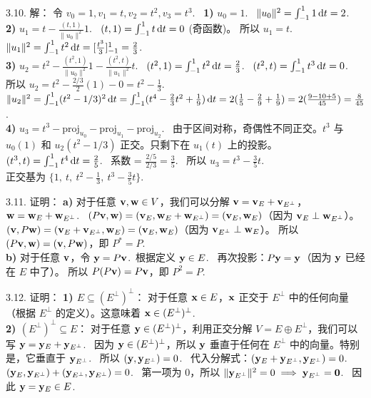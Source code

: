 \begin{exer}
3.10. 解：
令 $v_0 = 1, v_1 = t, v_2 = t^2, v_3 = t^3$.~
\textbf{1)} $u_0 = 1$.~
$\|u_0\|^2 = \int_{-1}^1 1 \mathop{}\!\mathrm{d} t = 2$.~
\\
\textbf{2)} $u_1 = t - \frac{(t, 1)}{\|u_0\|^2} 1$.~
$(t, 1) = \int_{-1}^1 t \mathop{}\!\mathrm{d} t = 0$ (奇函数)。
所以 $u_1 = t$.~
$\|u_1\|^2 = \int_{-1}^1 t^2 \mathop{}\!\mathrm{d} t = [\frac{t^3}{3}]_{-1}^1 = \frac{2}{3}$.~
\\
\textbf{3)} $u_2 = t^2 - \frac{(t^2, 1)}{\|u_0\|^2} 1 - \frac{(t^2, t)}{\|u_1\|^2} t$.~
$(t^2, 1) = \int_{-1}^1 t^2 \mathop{}\!\mathrm{d} t = \frac{2}{3}$.~
$(t^2, t) = \int_{-1}^1 t^3 \mathop{}\!\mathrm{d} t = 0$.~
所以 $u_2 = t^2 - \frac{2/3}{2} (1) - 0 = t^2 - \frac{1}{3}$.~
$\|u_2\|^2 = \int_{-1}^1 (t^2 - 1/3)^2 \mathop{}\!\mathrm{d} t = \int_{-1}^1 (t^4 - \frac{2}{3}t^2 + \frac{1}{9}) \mathop{}\!\mathrm{d} t = 2(\frac{1}{5} - \frac{2}{9} + \frac{1}{9}) = 2(\frac{9 - 10 + 5}{45}) = \frac{8}{45}$.~
\\
\textbf{4)} $u_3 = t^3 - \text{proj}_{u_0} - \text{proj}_{u_1} - \text{proj}_{u_2}$.~
由于区间对称，奇偶性不同正交。$t^3$ 与 $u_0(1)$ 和 $u_2(t^2-1/3)$ 正交。只剩下在 $u_1(t)$ 上的投影。
$(t^3, t) = \int_{-1}^1 t^4 \mathop{}\!\mathrm{d} t = \frac{2}{5}$.~
系数 = $\frac{2/5}{2/3} = \frac{3}{5}$.~
所以 $u_3 = t^3 - \frac{3}{5}t$.~
\\
正交基为 $\{1, \ t, \ t^2 - \frac{1}{3}, \ t^3 - \frac{3}{5}t\}$.~

3.11. 证明：
\textbf{a)}
对于任意 $\mathbf{v}, \mathbf{w} \in V$，我们可以分解 $\mathbf{v} = \mathbf{v}_E + \mathbf{v}_{E^\perp}$，$\mathbf{w} = \mathbf{w}_E + \mathbf{w}_{E^\perp}$.~
$(P\mathbf{v}, \mathbf{w}) = (\mathbf{v}_E, \mathbf{w}_E + \mathbf{w}_{E^\perp}) = (\mathbf{v}_E, \mathbf{w}_E)$（因为 $\mathbf{v}_E \perp \mathbf{w}_{E^\perp}$）。
$(\mathbf{v}, P\mathbf{w}) = (\mathbf{v}_E + \mathbf{v}_{E^\perp}, \mathbf{w}_E) = (\mathbf{v}_E, \mathbf{w}_E)$（因为 $\mathbf{v}_{E^\perp} \perp \mathbf{w}_E$）。
所以 $(P\mathbf{v}, \mathbf{w}) = (\mathbf{v}, P\mathbf{w})$，即 $P^* = P$.~
\\
\textbf{b)}
对于任意 $\mathbf{v}$，令 $\mathbf{y} = P\mathbf{v}$.~根据定义 $\mathbf{y} \in E$.~
再次投影：$P\mathbf{y} = \mathbf{y}$（因为 $\mathbf{y}$ 已经在 $E$ 中了）。
所以 $P(P\mathbf{v}) = P\mathbf{v}$，即 $P^2 = P$.~

3.12. 证明：
\textbf{1) $E \subseteq (E^\perp)^\perp$}：
对于任意 $\mathbf{x} \in E$，$\mathbf{x}$ 正交于 $E^\perp$ 中的任何向量（根据 $E^\perp$ 的定义）。这意味着 $\mathbf{x} \in (E^\perp)^\perp$.~
\\
\textbf{2) $(E^\perp)^\perp \subseteq E$}：
对于任意 $\mathbf{y} \in (E^\perp)^\perp$，利用正交分解 $V = E \oplus E^\perp$，我们可以写 $\mathbf{y} = \mathbf{y}_E + \mathbf{y}_{E^\perp}$.~
因为 $\mathbf{y} \in (E^\perp)^\perp$，所以 $\mathbf{y}$ 垂直于任何在 $E^\perp$ 中的向量。特别是，它垂直于 $\mathbf{y}_{E^\perp}$.~
所以 $(\mathbf{y}, \mathbf{y}_{E^\perp}) = 0$.~
代入分解式：$(\mathbf{y}_E + \mathbf{y}_{E^\perp}, \mathbf{y}_{E^\perp}) = 0$.~
$(\mathbf{y}_E, \mathbf{y}_{E^\perp}) + (\mathbf{y}_{E^\perp}, \mathbf{y}_{E^\perp}) = 0$.~
第一项为 0，所以 $\|\mathbf{y}_{E^\perp}\|^2 = 0 \implies \mathbf{y}_{E^\perp} = \mathbf{0}$.~
因此 $\mathbf{y} = \mathbf{y}_E \in E$.~


\end{exer}

